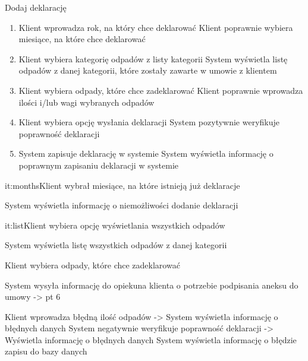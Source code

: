 	\begin{usecase}{Dodaj deklarację} 
		\author{Beata Obrok}
		\maketitle
		\begin{scenario}
			\begin{enumerate}
				\item Klient wprowadza rok, na który chce deklarować
				 Klient poprawnie wybiera miesiące, na które chce deklarować
				\item Klient wybiera kategorię odpadów z listy kategorii
				 System wyświetla listę odpadów z danej kategorii, które zostały zawarte w umowie z klientem
				\item Klient wybiera odpady, które chce zadeklarować
				 Klient poprawnie wprowadza ilości i/lub wagi wybranych odpadów
				\item Klient wybiera opcję wysłania deklaracji
				 System pozytywnie weryfikuje poprawność deklaracji
				\item System zapisuje deklarację w systemie
				 System wyświetla informację o poprawnym zapisaniu deklaracji w systemie
			\end{enumerate}
		\end{scenario}
		\begin{extensions}
			\begin{extlist}{it:months}{Klient wybrał miesiące, na które istnieją już deklaracje}
				\item System wyświetla informację o niemożliwości dodanie deklaracji
			\end{extlist}
			\begin{extlist}{it:list}{Klient wybiera opcję wyświetlania wszystkich odpadów}
				\item System wyświetla listę wszystkich odpadów z danej kategorii 
				\item Klient wybiera odpady, które chce zadeklarować 
				\item System wysyła informację do opiekuna klienta o potrzebie podpisania aneksu do umowy -> pt 6 
			\end{extlist}
			\begin{enumerate}
			 Klient wprowadza błędną ilość odpadów -> System wyświetla informację o błędnych danych 
			 System negatywnie weryfikuje poprawność deklaracji -> Wyświetla informację o błędnych danych 
			 System wyświetla informację o błędzie zapisu do bazy danych 
			\end{enumerate}
		\end{extensions}
	\end{usecase}

